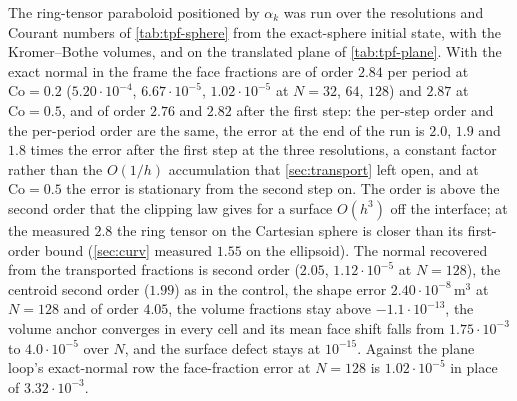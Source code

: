 \documentclass[preprint,12pt]{elsarticle}
\begin{document}
The ring-tensor paraboloid positioned by $\alpha_k$ was run over the resolutions and Courant numbers of \cref{tab:tpf-sphere} from the exact-sphere initial state, with the Kromer--Bothe volumes, and on the translated plane of \cref{tab:tpf-plane}. With the exact normal in the frame the face fractions are of order $2.84$ per period at $\mathrm{Co} = 0.2$ ($5.20\cdot10^{-4}$, $6.67\cdot10^{-5}$, $1.02\cdot10^{-5}$ at $N = 32$, $64$, $128$) and $2.87$ at $\mathrm{Co} = 0.5$, and of order $2.76$ and $2.82$ after the first step: the per-step order and the per-period order are the same, the error at the end of the run is $2.0$, $1.9$ and $1.8$ times the error after the first step at the three resolutions, a constant factor rather than the $O(1/h)$ accumulation that \cref{sec:transport} left open, and at $\mathrm{Co} = 0.5$ the error is stationary from the second step on. The order is above the second order that the clipping law gives for a surface $O(h^3)$ off the interface; at the measured $2.8$ the ring tensor on the Cartesian sphere is closer than its first-order bound (\cref{sec:curv} measured $1.55$ on the ellipsoid). The normal recovered from the transported fractions is second order ($2.05$, $1.12\cdot10^{-5}$ at $N = 128$), the centroid second order ($1.99$) as in the control, the shape error $2.40\cdot10^{-8}\,\mathrm{m^3}$ at $N = 128$ and of order $4.05$, the volume fractions stay above $-1.1\cdot10^{-13}$, the volume anchor converges in every cell and its mean face shift falls from $1.75\cdot10^{-3}$ to $4.0\cdot10^{-5}$ over $N$, and the surface defect stays at $10^{-15}$. Against the plane loop's exact-normal row the face-fraction error at $N = 128$ is $1.02\cdot10^{-5}$ in place of $3.32\cdot10^{-3}$.
\end{document}
